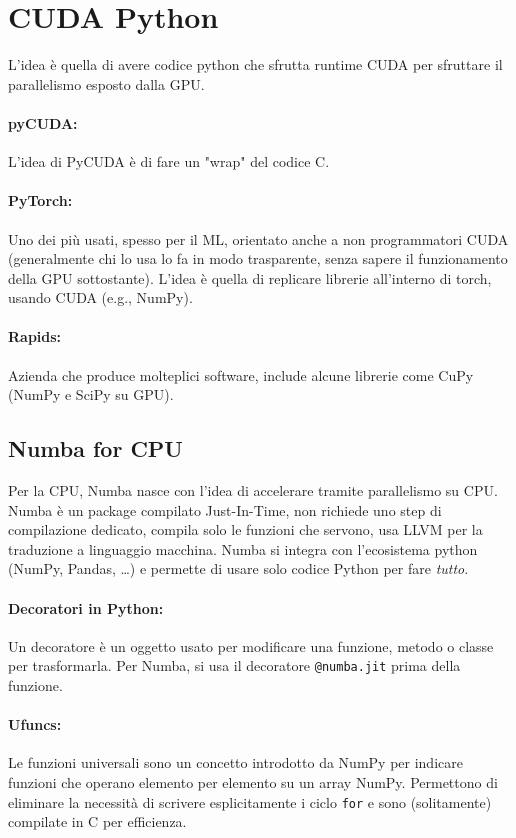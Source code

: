 \section{CUDA Python}

L'idea è quella di avere codice python che sfrutta runtime CUDA per sfruttare il parallelismo esposto dalla GPU.

\paragraph{pyCUDA:} L'idea di PyCUDA è di fare un "wrap" del codice C.

\paragraph{PyTorch:} Uno dei più usati, spesso per il ML, orientato anche a non programmatori CUDA (generalmente chi lo usa lo fa in modo trasparente, senza sapere il funzionamento della GPU sottostante). L'idea è quella di replicare librerie all'interno di torch, usando CUDA (e.g., NumPy).

\paragraph{Rapids:} Azienda che produce molteplici software, include alcune librerie come CuPy (NumPy e SciPy su GPU). 

\subsection{Numba for CPU}

Per la CPU, Numba nasce con l'idea di accelerare tramite parallelismo su CPU.  Numba è un package compilato Just-In-Time, non richiede uno step di compilazione dedicato, compila solo le funzioni che servono, usa LLVM per la traduzione a linguaggio macchina. Numba si integra con l'ecosistema python (NumPy, Pandas, \dots) e permette di usare solo codice Python per fare \textit{tutto}.

\paragraph{Decoratori in Python:} Un decoratore è un oggetto usato per modificare una funzione, metodo o classe per trasformarla. Per Numba, si usa il decoratore \texttt{@numba.jit} prima della funzione. 

\paragraph{Ufuncs:} Le funzioni universali sono un concetto introdotto da NumPy per indicare funzioni che operano elemento per elemento su un array NumPy. Permettono di eliminare la necessità di scrivere esplicitamente i ciclo \texttt{for} e sono (solitamente) compilate in C per efficienza. 

